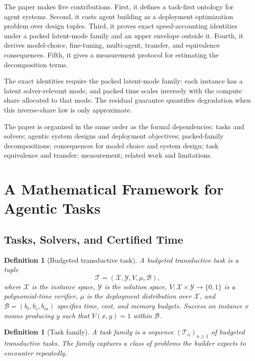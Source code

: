 \documentclass[10pt]{article}
\theoremstyle{paperplain}
\theoremstyle{paperdefinition}
\newtheorem{definition}[theorem]{Definition}
\theoremstyle{paperremark}
\newcommand{\cX}{\mathcal{X}}
\newcommand{\cY}{\mathcal{Y}}
\newcommand{\cT}{\mathcal{T}}
\newcommand{\cB}{\mathcal{B}}
\begin{document}
The paper makes five contributions. First, it defines a task-first ontology for agent systems. Second, it casts agent building as a deployment optimization problem over design tuples. Third, it proves exact speed-accounting identities under a packed latent-mode family and an upper envelope outside it. Fourth, it derives model-choice, fine-tuning, multi-agent, transfer, and equivalence consequences. Fifth, it gives a measurement protocol for estimating the decomposition terms.

The exact identities require the packed latent-mode family: each instance has a latent solver-relevant mode, and packed time scales inversely with the compute share allocated to that mode. The residual guarantee quantifies degradation when this inverse-share law is only approximate.

The paper is organized in the same order as the formal dependencies: tasks and solvers; agentic system designs and deployment objectives; packed-family decompositions; consequences for model choice and system design; task equivalence and transfer; measurement; related work and limitations.

\section{A Mathematical Framework for Agentic Tasks}
\label{sec:framework}

\subsection{Tasks, Solvers, and Certified Time}

\begin{definition}[Budgeted transductive task]
\label{def:task}
A \emph{budgeted transductive task} is a tuple
\[
\cT=(\cX,\cY,V,\mu,\cB),
\]
where $\cX$ is the instance space, $\cY$ is the solution space, $V:\cX\times\cY\to\{0,1\}$ is a polynomial-time verifier, $\mu$ is the deployment distribution over $\cX$, and $\cB=(b_t,b_c,b_m)$ specifies time, cost, and memory budgets.
Success on instance $x$ means producing $y$ such that $V(x,y)=1$ within $\cB$.
\end{definition}

\begin{definition}[Task family]
\label{def:task-family}
A \emph{task family} is a sequence $(\cT_n)_{n \ge 1}$ of budgeted transductive tasks.
The family captures a class of problems the builder expects to encounter repeatedly.
\end{definition}
\end{document}
